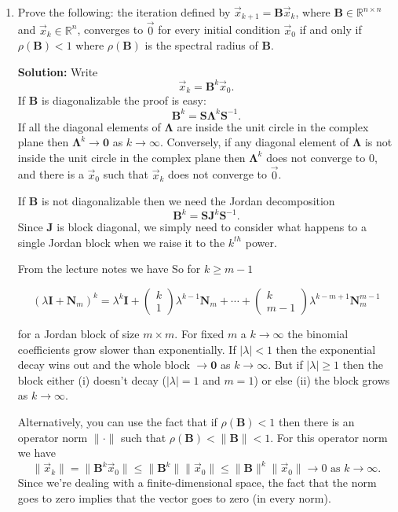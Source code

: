 \documentclass[11pt,fleqn]{article}
\begin{document}
\begin{enumerate}
\item Prove the following: the iteration defined by $\vec{x}_{k+1}=\mathbf{B}\vec{x}_k$, where $\mathbf{B}\in\mathbb{R}^{n\times n}$ and $\vec{x}_k\in\mathbb{R}^n$,  converges to $\vec{0}$ for every initial condition $\vec{x}_0$ if and only if $\rho(\mathbf{B})<1$ where $\rho(\mathbf{B})$ is the spectral radius of $\mathbf{B}$.

{\bf Solution:} Write
\[\vec{x}_k = \mathbf{B}^k\vec{x}_0.\]
 If $\mathbf{B}$ is diagonalizable the proof is easy:
 \[\mathbf{B}^k = \mathbf{S\Lambda}^k\mathbf{S}^{-1}.\]
 If all the diagonal elements of $\mathbf{\Lambda}$ are inside the unit circle in the complex plane then $\mathbf{\Lambda}^k\to\mathbf{0}$ as $k\to\infty$.
 Conversely, if any diagonal element of $\mathbf{\Lambda}$ is not inside the unit circle in the complex plane then $\mathbf{\Lambda}^k$ does not converge to 0, and there is a $\vec{x}_0$ such that $\vec{x}_k$ does not converge to $\vec{0}$.
 
 If $\mathbf{B}$ is not diagonalizable then we need the Jordan decomposition
 \[\mathbf{B}^k = \mathbf{SJ}^k\mathbf{S}^{-1}.\]
 Since $\mathbf{J}$ is block diagonal, we simply need to consider what happens to a single Jordan block when we raise it to the $k^{th}$ power.
 
 From the lecture notes we have
 So for $k\ge m-1$

$$(\lambda\mathbf{I} + \mathbf{N}_m)^k = \lambda^k\mathbf{I} + \left(\begin{array}{c}k\\1\end{array}\right)\lambda^{k-1}\mathbf{N}_m + \cdots + \left(\begin{array}{c}k\\m-1\end{array}\right)\lambda^{k-m+1}\mathbf{N}_m^{m-1}$$

for a Jordan block of size $m\times m$.
For fixed $m$ a $k\to\infty$ the binomial coefficients grow slower than exponentially.
If $|\lambda|<1$ then the exponential decay wins out and the whole block $\to\mathbf{0}$ as $k\to\infty$.
But if $|\lambda|\ge 1$ then the block either (i) doesn't decay ($|\lambda|=1$ and $m=1$) or else (ii) the block grows as $k\to\infty$.

Alternatively, you can use the fact that if $\rho(\mathbf{B})<1$ then there is an operator norm $\|\cdot\|$ such that $\rho(\mathbf{B})<\|\mathbf{B}\|<1$.
For this operator norm we have
\[\|\vec{x}_k\| = \|\mathbf{B}^k\vec{x}_0\|\le \|\mathbf{B}^k\|\|\vec{x}_0\|\le \|\mathbf{B}\|^k\|\vec{x}_0\|\to0\text{ as }k\to\infty.\]
Since we're dealing with a finite-dimensional space, the fact that the norm goes to zero implies that the vector goes to zero (in every norm).

\end{enumerate}
 
\end{document}
